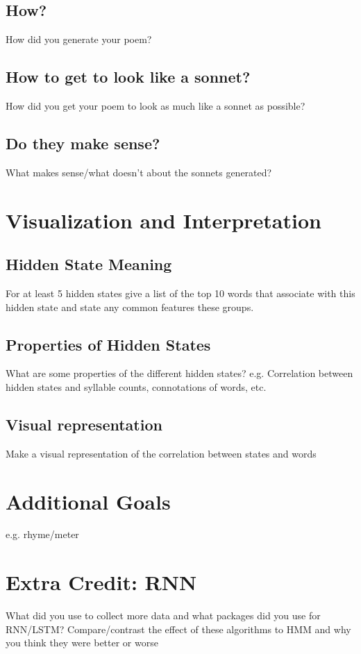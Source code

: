 \subsection{How?}
How did you generate your poem?
\subsection{How to get to look like a sonnet?}
How did you get your poem to look as much like a sonnet as possible?
\subsection{Do they make sense?}
What makes sense/what doesn't about the sonnets generated?

\section{Visualization and Interpretation}
\subsection{Hidden State Meaning}
For at least 5 hidden states give a list of the top 10 words that associate with this hidden state and state any common features these groups.
\subsection{Properties of Hidden States}
What are some properties of the different hidden states?
e.g. Correlation between hidden states and syllable counts, connotations of words, etc.
\subsection{Visual representation}
Make a visual representation of the correlation between states and words

\section{Additional Goals}
e.g. rhyme/meter

\section{Extra Credit: RNN}
What did you use to collect more data and what packages did you use for RNN/LSTM?
Compare/contrast the effect of these algorithms to HMM and why you think they were better or worse

